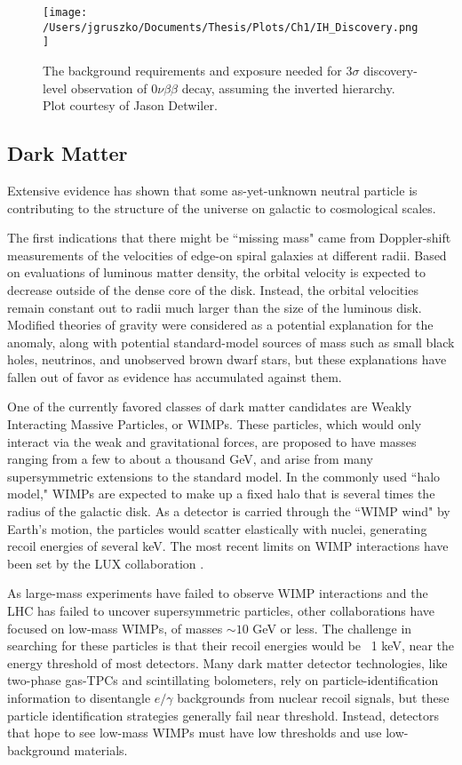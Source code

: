\begin{figure}[h]
\hfil \texttt{[image: /Users/jgruszko/Documents/Thesis/Plots/Ch1/IH\_Discovery.png]} \hfil
\caption{The background requirements and exposure needed for $3\sigma$ discovery-level observation of $0\nu\beta\beta$ decay, assuming the inverted hierarchy. Plot courtesy of Jason Detwiler.}
\label{IH_Discovery}
\end{figure}


\subsection{Dark Matter}
Extensive evidence has shown that some as-yet-unknown neutral particle is contributing to the structure of the universe on galactic to cosmological scales. 

The first indications that there might be ``missing mass" came from Doppler-shift measurements of the velocities of edge-on spiral galaxies at different radii. Based on evaluations of luminous matter density, the orbital velocity is expected to decrease outside of the dense core of the disk. Instead, the orbital velocities remain constant out to radii much larger than the size of the luminous disk. \cite{Corbelli2000}  Modified theories of gravity were considered as a potential explanation for the anomaly, along with potential standard-model sources of mass such as small black holes, neutrinos, and unobserved brown dwarf stars, but these explanations have fallen out of favor as evidence has accumulated against them. \cite{BulletCluster2004} \cite{PlanckXIV2015}

One of the currently favored classes of dark matter candidates are Weakly Interacting Massive Particles, or WIMPs. These particles, which would only interact via the weak and gravitational forces, are proposed to have masses ranging from a few to about a thousand GeV, and arise from many supersymmetric extensions to the standard model. In the commonly used ``halo model," WIMPs are expected to make up a fixed halo that is several times the radius of the galactic disk. As a detector is carried through the ``WIMP wind" by Earth's motion, the particles would scatter elastically with nuclei, generating recoil energies of several keV. The most recent limits on WIMP interactions have been set by the LUX collaboration \cite{LUX_2013}. 

As large-mass experiments have failed to observe WIMP interactions and the LHC has failed to uncover supersymmetric particles, other collaborations have focused on low-mass WIMPs, of masses $\sim10$ GeV or less. \cite{COGENT2011} \cite{CDMSLite2014} The challenge in searching for these particles is that their recoil energies would be ~1 keV, near the energy threshold of most detectors. Many dark matter detector technologies, like two-phase gas-TPCs and scintillating bolometers, rely on particle-identification information to disentangle $e/\gamma$ backgrounds from nuclear recoil signals, but these particle identification strategies generally fail near threshold. Instead, detectors that hope to see low-mass WIMPs must have low thresholds and use low-background materials.  

